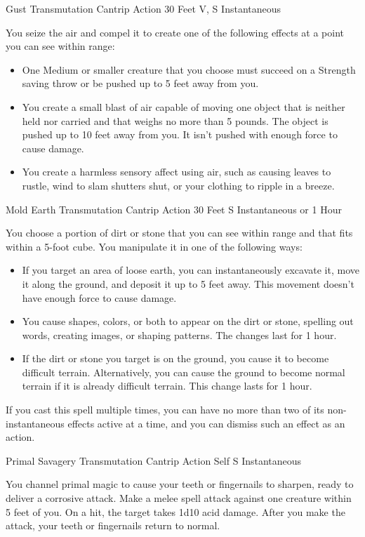 \documentclass[letterpaper,openany,oneside,twocolumn]{book}
\begin{document}
\DndSpellHeader
  {Gust}
  {Transmutation Cantrip}
  {Action}
  {30 Feet}
  {V, S}
  {Instantaneous}

You seize the air and compel it to create one of the following effects at a point you can see within range:
\begin{itemize}
	\item One Medium or smaller creature that you choose must succeed on a Strength saving throw or be pushed up to 5 feet away from you.
	\item You create a small blast of air capable of moving one object that is neither held nor carried and that weighs no more than 5 pounds. The object is pushed up to 10 feet away from you. It isn't pushed with enough force to cause damage.
	\item You create a harmless sensory affect using air, such as causing leaves to rustle, wind to slam shutters shut, or your clothing to ripple in a breeze.
\end{itemize}

\DndSpellHeader
  {Mold Earth}
  {Transmutation Cantrip}
  {Action}
  {30 Feet}
  {S}
  {Instantaneous or 1 Hour}

You choose a portion of dirt or stone that you can see within range and that fits within a 5-foot cube. You manipulate it in one of the following ways:
\begin{itemize}
	\item If you target an area of loose earth, you can instantaneously excavate it, move it along the ground, and deposit it up to 5 feet away. This movement doesn't have enough force to cause damage.
	\item You cause shapes, colors, or both to appear on the dirt or stone, spelling out words, creating images, or shaping patterns. The changes last for 1 hour.
	\item If the dirt or stone you target is on the ground, you cause it to become difficult terrain. Alternatively, you can cause the ground to become normal terrain if it is already difficult terrain. This change lasts for 1 hour.
\end{itemize}
If you cast this spell multiple times, you can have no more than two of its non-instantaneous effects active at a time, and you can dismiss such an effect as an action.

\DndSpellHeader
  {Primal Savagery}
  {Transmutation Cantrip}
  {Action}
  {Self}
  {S}
  {Instantaneous}

You channel primal magic to cause your teeth or fingernails to sharpen, ready to deliver a corrosive attack. Make a melee spell attack against one creature within 5 feet of you. On a hit, the target takes 1d10 acid damage. After you make the attack, your teeth or fingernails return to normal.
\end{document}
